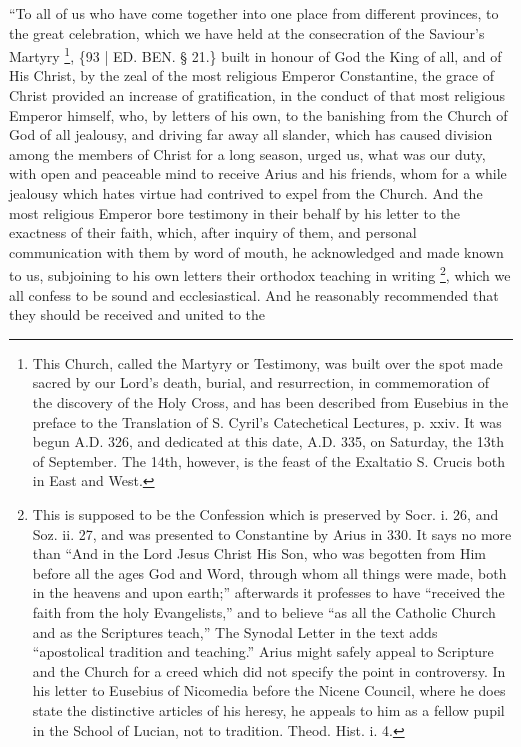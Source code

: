 ``To all of us who have come
together into one place from different provinces, to the great
celebration, which we have held at the consecration of the Saviour's
Martyry \footnote{This Church, called the Martyry or Testimony, was built over the spot
made sacred by our Lord's death, burial, and resurrection, in
commemoration of the discovery of the Holy Cross, and has been
described from Eusebius in the preface to the Translation of S. Cyril's
Catechetical Lectures, p. xxiv. It was begun A.D.
326, and dedicated at this date, A.D. 335, on Saturday, the
13th of September. The 14th, however, is the feast of the Exaltatio S.
Crucis both in East and West.}, \{93 | ED.
BEN. § 21.\} built in honour of God the King of
all, and of His Christ, by the zeal of the most religious Emperor
Constantine, the grace of Christ provided an increase of
gratification, in the conduct of that most religious Emperor himself,
who, by letters of his own, to the banishing from the Church of God of
all jealousy, and driving far away all slander, which has caused
division among the members of Christ for a long season, urged us, what
was our duty, with open and peaceable mind to receive Arius and his
friends, whom for a while jealousy which hates virtue had contrived to
expel from the Church. And the most religious Emperor bore testimony
in their behalf by his letter to the exactness of their faith, which,
after inquiry of them, and personal communication with them by word of
mouth, he acknowledged and made known to us, subjoining to his own
letters their orthodox teaching in writing \footnote{This is supposed to be the Confession which is preserved by Socr. i.
26, and Soz. ii. 27, and was presented to Constantine by Arius in 330.
It says no more than ``And in the Lord Jesus Christ His Son, who was
begotten from Him before all the ages God and Word, through whom all
things were made, both in the heavens and upon earth;'' afterwards it
professes to have ``received the faith from the holy Evangelists,'' and
to believe ``as all the Catholic Church and as the Scriptures teach,''
The Synodal Letter in the text adds ``apostolical tradition and
teaching.'' Arius might safely appeal to Scripture and the Church for a
creed which did not specify the point in controversy. In his letter to
Eusebius of Nicomedia before the Nicene Council, where he does state
the distinctive articles of his heresy, he appeals to him as a fellow
pupil in the School of Lucian, not to tradition. Theod. Hist. i. 4.}, which we all confess to be sound and ecclesiastical. And he
reasonably recommended that they should be received and united to the
